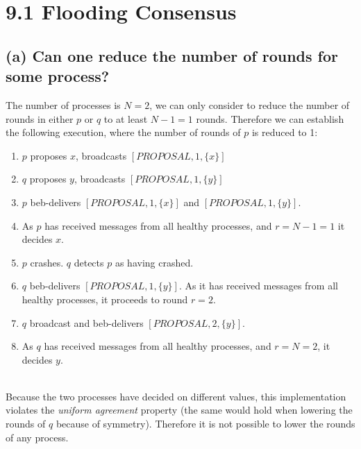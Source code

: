 \documentclass{article}
\begin{document}
	\pagestyle{fancy}
	\section*{9.1 Flooding Consensus}
	\begin{adjustwidth}{2em}{2em}
		\subsection*{(a) Can one reduce the number of rounds for some process?}
		\begin{adjustwidth}{2em}{2em}
			The number of processes is $N = 2$, we can only consider to reduce the number of rounds in either $p$ or $q$ to at least $N - 1 = 1$ rounds. Therefore we can establish the following execution, where the number of rounds of $p$ is reduced to 1: \\
			\begin{enumerate}[-]
				\item $p$ proposes $x$, broadcasts $[PROPOSAL, 1, \{x\}]$
				\item $q$ proposes $y$, broadcasts $[PROPOSAL, 1, \{y\}]$
				\item $p$ beb-delivers $[PROPOSAL, 1, \{x\}]$ and $[PROPOSAL, 1, \{y\}]$.
				\item As $p$ has received messages from all healthy processes, and $r = N - 1 = 1$ it decides $x$.
				\item $p$ crashes. $q$ detects $p$ as having crashed.
				\item $q$ beb-delivers $[PROPOSAL, 1, \{y\}]$. As it has received messages from all healthy processes, it proceeds to round $r = 2$.
				\item $q$ broadcast and beb-delivers $[PROPOSAL, 2, \{y\}]$.
				\item As $q$ has received messages from all healthy processes, and $r = N = 2$, it decides $y$.
			\end{enumerate}
			\hfill \\
			Because the two processes have decided on different values, this implementation violates the \textit{uniform agreement} property (the same would hold when lowering the rounds of $q$ because of symmetry). Therefore it is not possible to lower the rounds of any process.
		\end{adjustwidth}

\end{adjustwidth}
\end{document}
